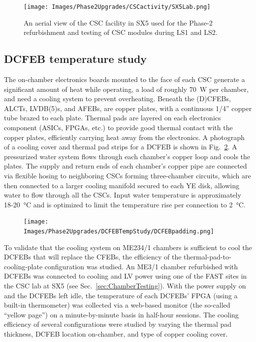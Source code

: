 \begin{figure}[H]
    \centering
    \texttt{[image: Images/Phase2Upgrades/CSCactivity/SX5Lab.png]}
    \caption{An aerial view of the CSC facility in SX5 used for the Phase-2 refurbishment and testing of CSC modules during LS1 and LS2.}
    \label{fig:SX5}
\end{figure}

\subsection{DCFEB temperature study} \label{sec:DCFEBTemperatureStudy}
The on-chamber electronics boards mounted to the face of each CSC generate a significant amount of heat while operating, a load of roughly \SI{70}{W} per chamber, and need a cooling system to prevent overheating. Beneath the (D)CFEBs, ALCTs, LVDB(5)s, and AFEBs, are copper plates, with a continuous 1/4'' copper tube brazed to each plate. Thermal pads are layered on each electronics component (ASICs, FPGAs, etc.) to provide good thermal contact with the copper plates, efficiently carrying heat away from the electronics. A photograph of a cooling cover and thermal pad strips for a DCFEB is shown in Fig.~\ref{fig:CoolingCover}. A pressurized water system flows through each chamber's copper loop and cools the plates. The supply and return ends of each chamber's copper pipe are connected via flexible hosing to neighboring CSCs forming three-chamber circuits, which are then connected to a larger cooling manifold secured to each YE disk, allowing water to flow through all the CSCs. Input water temperature is approximately 18-\SI{20}{\celsius} and is optimized to limit the temperature rise per connection to \SI{2}{\celsius}.

\begin{figure}[H]
    \centering
    \texttt{[image: Images/Phase2Upgrades/DCFEBTempStudy/DCFEBpadding.png]}
    \caption{}
    \label{fig:CoolingCover}
\end{figure}

To validate that the cooling system on ME234/1 chambers is sufficient to cool the DCFEBs that will replace the CFEBs, the efficiency of the thermal-pad-to-cooling-plate configuration was studied. An ME3/1 chamber refurbished with DCFEBs was connected to cooling and LV power using one of the FAST sites in the CSC lab at SX5 (see Sec.~\ref{sec:ChamberTesting}). With the power supply on and the DCFEBs left idle, the temperature of each DCFEBs' FPGA (using a built-in thermometer) was collected via a web-based monitor (the so-called ``yellow page'') on a minute-by-minute basis in half-hour sessions. The cooling efficiency of several configurations were studied by varying the thermal pad thickness, DCFEB location on-chamber, and type of copper cooling cover. 

